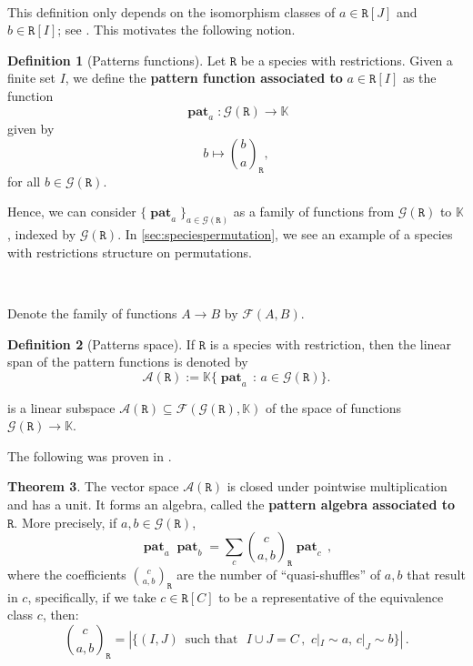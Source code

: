 \documentclass[12pt, reqno]{amsart}
\theoremstyle{definition}
\newtheorem{thm}{Theorem}[section]
\newtheorem{defin}[thm]{Definition}
\DeclareMathOperator{\pat}{\mathbf{pat}}
\newcommand{\prR}{\mathtt{R}}
\begin{document}
\

This definition only depends on the isomorphism classes of $a \in \prR[J]$ and $b \in \prR[I]$; see \cite{Penaguiao2020}. This motivates the following notion.

\begin{defin}[Patterns functions]\label{defin:pattern}
Let $\prR$ be a species with restrictions. Given a finite set $I$, we define the {\bf pattern function associated to} $a \in \prR[I]$ as the function
\[\pat_a: \mathcal{G}(\prR) \to \mathbb{K} \]
given by
\begin{equation}
    b \mapsto \binom{b}{a}_{\!\prR},
\end{equation}
for all $b \in \mathcal{G}(\prR)$.
\end{defin}

Hence, we can consider $\{ \pat_a \}_{a\in \mathcal{G}(\prR)}$ as a family of functions from $\mathcal{G}(\prR)$ to $\mathbb{K}$, indexed by $\mathcal{G}(\prR)$.
In \cref{sec:speciespermutation}, we see an example of a species with restrictions structure on permutations.

\

Denote the family of functions $A \to B$ by $\mathcal{F} (A, B)$.


\begin{defin}[Patterns space]
If $\prR$ is a species with restriction, then the linear span of the pattern functions is denoted by
\begin{equation}
    \mathcal{A}(\prR):=\mathbb{K}\{\pat_a \, : \, a\in \mathcal{G}(\prR)\}.
\end{equation}



is a linear subspace $\mathcal{A}(\prR) \subseteq \mathcal{F}(\mathcal{G}(\prR) , \mathbb{K}) $ of the space of functions $\mathcal{G}(\prR) \to \mathbb{K}$.
\end{defin}




The following was proven in \cite{Penaguiao2020}.

\begin{thm}
The vector space $\mathcal{A}(\prR)$ is closed under pointwise multiplication and has a unit.
It forms an algebra, called the {\bf pattern algebra associated to} $\prR$.
More precisely, if $a, b \in \mathcal G(\prR)$,
\begin{equation}\label{eq:prodrule}
\pat_ a   \pat_b = \sum_c \binom{c}{a, b}_{\! \prR} \pat_c \, ,
\end{equation}
where the coefficients $\binom{c}{a, b}_{\!\prR}$ are the number of ``quasi-shuffles'' of $a, b$ that result in $c$, specifically, if we take $c\in \prR[C]$ to be a representative of the equivalence class $c$, then:
$$ \binom{c}{a, b}_{\!\prR} = \left| \{(I, J) \, \text{ such that } \, \,  I \cup J = C \, ,\, \, c|_{I} \sim a, \, c|_{J} \sim b \} \right| \, .  $$
\end{thm} 
\end{document}
